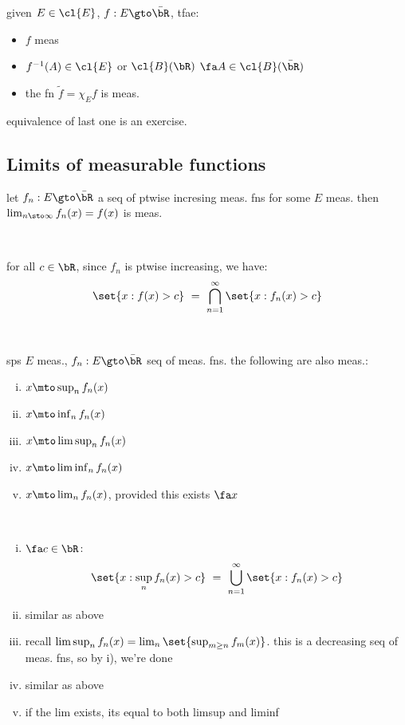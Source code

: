 given $E\in\cl{E}$, $f:E\gto\bar{\bR}$, tfae:
\begin{itemize}
	\item $f$ meas
	\item $f^{-1}(A)\in\cl{E}$ or $\cl{B}(\bR)$ $\fa A\in\cl{B}(\bar{\bR})$
	\item the fn $\tilde{f} = \chi_{E}f$ is meas.
\end{itemize}
equivalence of last one is an exercise.

\subsection{Limits of measurable functions}

\begin{prop}
	let $f_{n}:E\gto\bar{\bR}$ a seq of ptwise incresing meas. fns for some
	$E$ meas.
	then $\lim_{n\sto\infty}f_{n}(x)=f(x)$ is meas.
\end{prop} \

\begin{pf}
	for all $c\in\bR$, since $f_{n}$ is ptwise increasing, we have:
	\begin{equation*}
		\set{x:f(x)>c} \ = \ \bigcap_{n=1}^{\infty}\set{x:f_{n}(x)>c}
	\end{equation*}
\end{pf} \

\begin{thm}
	sps $E$ meas., $f_{n}:E\gto\bar{\bR}$ seq of meas. fns.
	the following are also meas.:
	\begin{enumerate}[i)]
		\item $x\mto\sup_{n}f_{n}(x)$
		\item $x\mto\inf_{n}f_{n}(x)$
		\item $x\mto\limsup_{n}f_{n}(x)$
		\item $x\mto\liminf_{n}f_{n}(x)$
		\item $x\mto\lim_{n}f_{n}(x)$, provided this exists $\fa x$
	\end{enumerate}
\end{thm} \

\begin{pf}\vspace{-0.2in}
	\begin{enumerate}[i)]
		\item $\fa c\in\bR$:
			\begin{equation*}
				\set{x:\sup_{n}f_{n}(x)>c} \ = \ \bigcup_{n=1}^{\infty}\set{x:f_{n}(x)>c}
			\end{equation*}
		\item similar as above
		\item recall $\limsup_{n}f_{n}(x)=\lim_{n}\set{\sup_{m\geq n}f_{m}(x)}$.
			this is a decreasing seq of meas. fns, so by i), we're done
		\item similar as above
		\item if the lim exists, its equal to both limsup and liminf
	\end{enumerate}
\end{pf}

